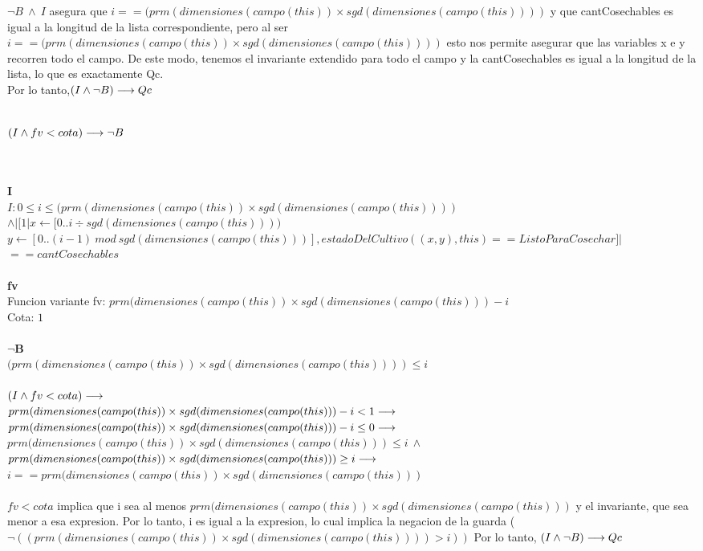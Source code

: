 \documentclass[a4paper]{article}
\begin{document}
$\neg B \ \land \ I$  asegura que $ i == (prm(dimensiones(campo(this)) \times sgd(dimensiones(campo(this))))$ y que cantCosechables es igual a la longitud de la lista correspondiente, pero al ser  $i == (prm(dimensiones(campo(this)) \times sgd(dimensiones(campo(this))))$ esto nos permite asegurar que las variables x e y recorren todo el campo. De este modo, tenemos el invariante extendido para todo el campo y la cantCosechables es igual a la longitud de la lista, lo que es exactamente Qc. \\
Por lo tanto,$(I \land \neg B) \longrightarrow Qc$\\
		\\
        \begin{Large}
        {$(I \land fv < cota) \longrightarrow \neg B$}
        \end{Large}\\
        \\
        \textbf{I}\\
         $ I: 0 \leq i \leq (prm(dimensiones(campo(this)) \times sgd(dimensiones(campo(this)))) $\\ 	$ \land | [1| x \leftarrow [0..i \div sgd(dimensiones(campo(this)))) $\\ $ y \leftarrow 	[0.. (i-1) \ mod \ sgd(dimensiones(campo(this)))], estadoDelCultivo((x,y), this) == ListoParaCosechar]| $\\$ == cantCosechables $ \\
        \\
        \textbf{fv}\\
        Funcion variante fv: $ prm(dimensiones(campo(this)) \times sgd(dimensiones(campo(this))) - i $\\
        Cota: $1$\\
        \\
       \textbf{$\neg$B}\\
        $(prm(dimensiones(campo(this)) \times sgd(dimensiones(campo(this)))) \leq i$\\
        \\
$(I \land fv < cota) \longrightarrow$\\
$prm(dimensiones(campo(this)) \times sgd(dimensiones(campo(this))) - i < 1 \longrightarrow$\\
$prm(dimensiones(campo(this)) \times sgd(dimensiones(campo(this))) - i \leq 0 \longrightarrow$\\
$prm(dimensiones(campo(this)) \times sgd(dimensiones(campo(this))) \leq i \ \land \ $\\$ prm(dimensiones(campo(this)) \times sgd(dimensiones(campo(this))) \geq i \longrightarrow$\\
$i == prm(dimensiones(campo(this)) \times sgd(dimensiones(campo(this)))$\\
\\
$fv < cota$ implica que i sea al menos $prm(dimensiones(campo(this)) \times sgd(dimensiones(campo(this)))$ y el invariante, que sea menor a esa expresion. Por lo tanto, i es igual a la expresion, lo cual implica la negacion de la guarda ($\neg ((prm(dimensiones(campo(this)) \times sgd(dimensiones(campo(this)))) > i))$
Por lo tanto, $(I \land \neg B) \longrightarrow Qc$
\end{document}
